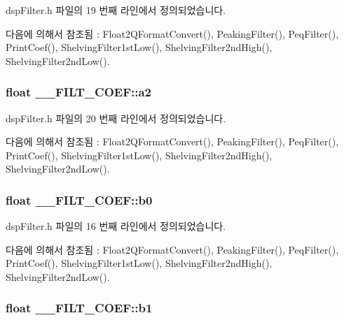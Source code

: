 dsp\+Filter.\+h 파일의 19 번째 라인에서 정의되었습니다.



다음에 의해서 참조됨 \+:  Float2\+Q\+Format\+Convert(), Peaking\+Filter(), Peq\+Filter(), Print\+Coef(), Shelving\+Filter1st\+Low(), Shelving\+Filter2nd\+High(), Shelving\+Filter2nd\+Low().

\hypertarget{struct_____f_i_l_t___c_o_e_f_aeb8fe784561c14b524f8d8527c723b2c}{
\subsubsection[{a2}]{\setlength{\rightskip}{0pt plus 5cm}float \+\_\+\+\_\+\+F\+I\+L\+T\+\_\+\+C\+O\+E\+F\+::a2}}\label{struct_____f_i_l_t___c_o_e_f_aeb8fe784561c14b524f8d8527c723b2c}


dsp\+Filter.\+h 파일의 20 번째 라인에서 정의되었습니다.



다음에 의해서 참조됨 \+:  Float2\+Q\+Format\+Convert(), Peaking\+Filter(), Peq\+Filter(), Print\+Coef(), Shelving\+Filter1st\+Low(), Shelving\+Filter2nd\+High(), Shelving\+Filter2nd\+Low().

\hypertarget{struct_____f_i_l_t___c_o_e_f_ab7a4e5aa04e332119f7ed50b2fdf55bc}{
\subsubsection[{b0}]{\setlength{\rightskip}{0pt plus 5cm}float \+\_\+\+\_\+\+F\+I\+L\+T\+\_\+\+C\+O\+E\+F\+::b0}}\label{struct_____f_i_l_t___c_o_e_f_ab7a4e5aa04e332119f7ed50b2fdf55bc}


dsp\+Filter.\+h 파일의 16 번째 라인에서 정의되었습니다.



다음에 의해서 참조됨 \+:  Float2\+Q\+Format\+Convert(), Peaking\+Filter(), Peq\+Filter(), Print\+Coef(), Shelving\+Filter1st\+Low(), Shelving\+Filter2nd\+High(), Shelving\+Filter2nd\+Low().

\hypertarget{struct_____f_i_l_t___c_o_e_f_a6b091370c641032308e29256f8ed3ea1}{
\subsubsection[{b1}]{\setlength{\rightskip}{0pt plus 5cm}float \+\_\+\+\_\+\+F\+I\+L\+T\+\_\+\+C\+O\+E\+F\+::b1}}\label{struct_____f_i_l_t___c_o_e_f_a6b091370c641032308e29256f8ed3ea1}


